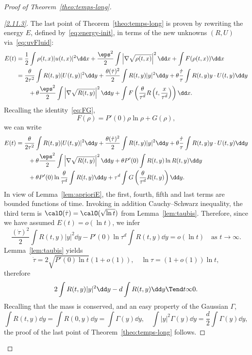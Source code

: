 \begin{proof}[Proof of Theorem~\ref{theo:temps-long}]
\begin{proof}[\eqref{2.11.3}]
The last point of Theorem~\ref{theo:temps-long} is proven by rewriting the energy $E$, defined by~\eqref{eq:energy-init}, in terms of the new unknowns $(R,U)$ via~\eqref{eq:uvFluid}:
\begin{align*}
E(t) &= \frac{1}{2}\int \rho(t,x)|u(t,x)|^2 \dd x+\frac{\eps^2}{2} \int \left|\nabla
\sqrt{\rho(t,x)}\right|^2 \dd x+\int F(\rho(t,x)) \dd x\\
&= \frac{\theta}{2\tau^2}\int R(t,y)|U(t,y)|^2\dd y +\frac{\theta(\dot
\tau)^2}{2}\int R(t,y)|y|^2\dd y +\theta \frac{\dot \tau}{\tau}\int R(t,y)y\cdot U(t,y)\dd y\\
&\qquad +\theta\frac{\eps^2}{2}\int \left|\nabla
\sqrt{R(t,y)}\right|^2\dd y +\int F\left(\frac{\theta}{\tau^d}R\left(t,\frac{x}{\tau^d}\right)\right)\dd x.
\end{align*}
Recalling the identity~\eqref{eq:FG},
\[
F(\rho) = P'(0)\rho \ln \rho + G(\rho),
\]
we can write
\begin{align*}
E(t) &= \frac{\theta}{2\tau^2}\int R(t,y)|U(t,y)|^2\dd y +\frac{\theta(\dot
\tau)^2}{2}\int R(t,y)|y|^2\dd y +\theta \frac{\dot \tau}{\tau}\int R(t,y)y\cdot U(t,y)\dd y\\
&\qquad +\theta\frac{\eps^2}{2}\int \left|\nabla
\sqrt{R(t,y)}\right|^2\dd y +\theta P'(0) \int R(t,y)\ln R(t,y)\dd y\\
&\qquad +\theta P'(0)\ln\frac{\theta}{\tau^d}\int R(t,y)\dd y + \tau^d\int G\left(\frac{\theta}{\tau^d}R(t,y)\right)\dd y.
\end{align*}
In view of Lemma~\ref{lem:aprioriE}, the first, fourth, fifth and last terms are bounded functions of time. Invoking in addition Cauchy--Schwarz inequality, the third term is $\calO(\dot
\tau)=\calO(\sqrt{\ln t})$ from Lemma~\ref{lem:taubis}. Therefore, since we have assumed $E(t)=o(\ln t)$, we infer
\[
\frac{(\dot
\tau)^2}{2}\int R(t,y)|y|^2\dd y - P'(0)\ln\tau^d\int R(t,y)\dd y =o(\ln t) \quad \text{as }t\to \infty.
\]
Lemma~\ref{lem:taubis} yields
\[
\dot \tau = 2\sqrt{P'(0)\ln t}\left(1+o(1)\right),\quad \ln \tau =\left(1+o(1)\right)\ln t,
\]
therefore
\[
2\int R(t,y)|y|^2\dd y-d\int R(t,y)\dd y \Tend t \infty 0.
\]
Recalling that the mass is conserved, and an easy property of the Gaussian $\Gamma$,
\[
\int R(t,y)\dd y = \int R(0,y)\dd y = \int \Gamma(y)\dd y,\quad \int |y|^2\Gamma(y)\dd y = \frac{d}{2} \int \Gamma(y)\dd y,
\]
the proof of the last point of Theorem~\ref{theo:temps-long} follows.
\end{proof}
\let\qed\relax
\end{proof}


